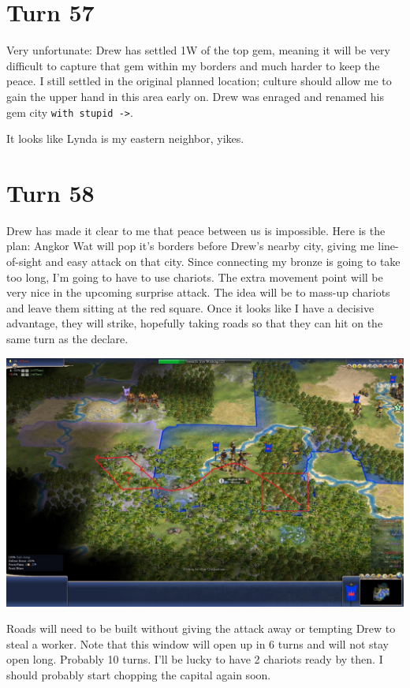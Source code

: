 \documentclass[10pt]{article}
\begin{document}
\section*{Turn 57}

Very unfortunate: Drew has settled 1W of the top gem, meaning it will
be very difficult to capture that gem within my borders and much
harder to keep the peace. I still settled in the original planned
location; culture should allow me to gain the upper hand in this area
early on. Drew was enraged and renamed his gem city \verb|with stupid ->|.

It looks like Lynda is my eastern neighbor, yikes.

\section*{Turn 58}

Drew has made it clear to me that peace between us is impossible. Here
is the plan: Angkor Wat will pop it's borders before Drew's nearby
city, giving me line-of-sight and easy attack on that city. Since
connecting my bronze is going to take too long, I'm going to have to
use chariots. The extra movement point will be very nice in the
upcoming surprise attack. The idea will be to mass-up chariots and
leave them sitting at the red square. Once it looks like I have a
decisive advantage, they will strike, hopefully taking roads so that
they can hit on the same turn as the declare.

\includegraphics[width=1.0\textwidth]{turn58}

Roads will need to be built without giving the attack away or tempting
Drew to steal a worker. Note that this window will open up in 6 turns
and will not stay open long. Probably 10 turns. I'll be lucky to have
2 chariots ready by then. I should probably start chopping the capital
again soon.
\end{document}
